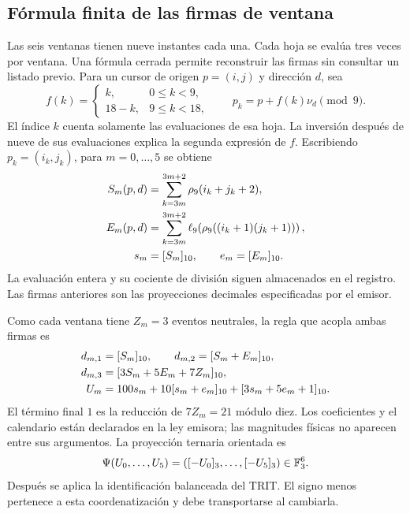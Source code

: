 \subsection{Fórmula finita de las firmas de ventana}

Las seis ventanas tienen nueve instantes cada una. Cada hoja se evalúa
tres veces por ventana. Una fórmula cerrada permite reconstruir las
firmas sin consultar un listado previo. Para un cursor de origen
\(p=(i,j)\) y dirección \(d\), sea
\[
 f(k)=\begin{cases}k,&0\le k<9,\\18-k,&9\le k<18,
 \end{cases}\qquad p_k=p+f(k)\nu_d\pmod9.
\]
El índice \(k\) cuenta solamente las evaluaciones de esa hoja. La
inversión después de nueve de sus evaluaciones explica la segunda
expresión de \(f\). Escribiendo \(p_k=(i_k,j_k)\), para
\(m=0,\ldots,5\) se obtiene
\begin{align}
 S_m(p,d)&=\sum_{k=3m}^{3m+2}\rho_9(i_k+j_k+2),\notag\\
 E_m(p,d)&=\sum_{k=3m}^{3m+2}
       \ell_9\!\left(\rho_9((i_k+1)(j_k+1))\right),\notag\\
 s_m&=[S_m]_{10},\qquad e_m=[E_m]_{10}.
 \label{vi:reg:firmas}
\end{align}
La evaluación entera y su cociente de división siguen almacenados en
el registro. Las firmas anteriores son las proyecciones decimales
especificadas por el emisor.

Como cada ventana tiene \(Z_m=3\) eventos neutrales, la regla que
acopla ambas firmas es
\begin{align}
 d_{m,1}&=[S_m]_{10},\qquad
 d_{m,2}=[S_m+E_m]_{10},\notag\\
 d_{m,3}&=[3S_m+5E_m+7Z_m]_{10},\notag\\
 U_m&=100s_m+10[s_m+e_m]_{10}+[3s_m+5e_m+1]_{10}.
 \label{eq:emisor-seis}
\end{align}
El término final \(1\) es la reducción de \(7Z_m=21\) módulo
diez. Los coeficientes y el calendario están declarados en la ley
emisora; las magnitudes físicas no aparecen entre sus argumentos.
La proyección ternaria orientada es
\begin{equation}
 \Psi(U_0,\ldots,U_5)=([-U_0]_3,\ldots,[-U_5]_3)
 \in\mathbb F_3^6.
 \label{eq:psi-catalogo}
\end{equation}
Después se aplica la identificación balanceada del TRIT. El signo
menos pertenece a esta coordenatización y debe transportarse al cambiarla.

